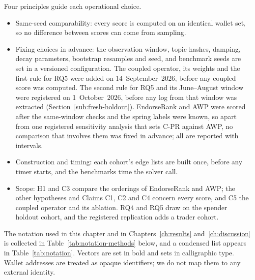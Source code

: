 Four principles guide each operational choice.
\begin{itemize}
\item Same-seed comparability: every score is computed on an identical wallet set, so no difference between scores can come from sampling.
\item Fixing choices in advance: the observation window, topic hashes, damping, decay parameters, bootstrap resamples and seed, and benchmark seeds are set in a versioned configuration. The coupled operator, its weights and the first rule for RQ5 were added on 14~September~2026, before any coupled score was computed. The second rule for RQ5 and its June--August window were registered on 1~October~2026, before any log from that window was extracted (Section~\ref{sub:fresh-holdout}). EndorseRank and AWP were scored after the same-window checks and the spring labels were known, so apart from one registered sensitivity analysis that sets C-PR against AWP, no comparison that involves them was fixed in advance; all are reported with intervals.
\item Construction and timing: each cohort's edge lists are built once, before any timer starts, and the benchmarks time the solver call.
\item Scope: H1 and C3 compare the orderings of EndorseRank and AWP; the other hypotheses and Claims C1, C2 and C4 concern every score, and C5 the coupled operator and its ablation. RQ4 and RQ5 draw on the spender holdout cohort, and the registered replication adds a trader cohort.
\end{itemize}


The notation used in this chapter and in Chapters~\ref{ch:results} and~\ref{ch:discussion} is collected in Table~\ref{tab:notation-methods} below, and a condensed list appears in Table~\ref{tab:notation}. Vectors are set in bold and sets in calligraphic type. Wallet addresses are treated as opaque identifiers; we do not map them to any external identity.

